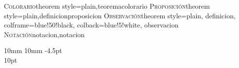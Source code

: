   {\textsc{Colorario}}{theorem style=plain,teorema}{colorario}
%
%
%
%
%
  {\textsc{Proposici\'on}}{theorem style=plain,definicion}{proposicion}
%
%
%
{\textsc{Observaci\'on}}{theorem style=plain,
definicion,
colframe=blue!50!black,
colback=blue!5!white,
 }{observacion}
%
% 
%
  {\textsc{Notaci\'on}}{notacion,}{notacion}
%
%
\theoremstyle{definition}
\newtheorem{Ejercicio}{\textcolor{blue!50!black}{Ejercicio}}[section]
%
   {10mm}       %
   {10mm}       %
   {\slshape}   %
   {-4.5pt}        %
   {\bfseries\color{blue!50!black}}  %
   {\\[5pt]}   %
   {10pt}       %
   {          } %
\theoremstyle{ejer}
\newtheorem{ejer}{Ejercicio.\,}[section]
\newtheorem{Ejemplo}{Ejemplo.\,}[section]
\newenvironment{cmargen}[1]{\begin{minipage}[c]{#1\linewidth}}{\end{minipage}}

